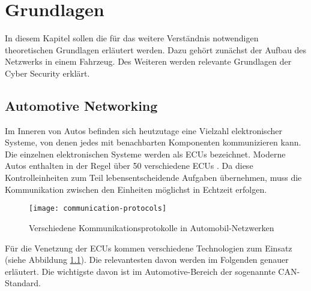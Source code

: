 \chapter{Grundlagen}
In diesem Kapitel sollen die für das weitere Verständnis notwendigen theoretischen Grundlagen erläutert werden. Dazu gehört zunächst der Aufbau des Netzwerks in einem Fahrzeug. Des Weiteren werden relevante Grundlagen der Cyber Security erklärt.

\section{Automotive Networking}
Im Inneren von Autos befinden sich heutzutage eine Vielzahl elektronischer Systeme, von denen jedes mit benachbarten Komponenten kommunizieren kann. Die einzelnen elektronischen Systeme werden als \acp{ECU} bezeichnet. Moderne Autos enthalten in der Regel über 50 verschiedene \acsp{ECU} \cite[vgl.][6]{Miller.2013}. Da diese Kontrolleinheiten zum Teil lebensentscheidende Aufgaben übernehmen, muss die Kommunikation zwischen den Einheiten möglichst in Echtzeit erfolgen. \\

\begin{figure}[H]
\centering
\texttt{[image: communication-protocols]}
\label{fig:communication-protocols}
\caption{Verschiedene Kommunikationsprotokolle in Automobil-Netzwerken}
\end{figure}

Für die Venetzung der \acsp{ECU} kommen verschiedene Technologien zum Einsatz (siehe Abbildung \ref{fig:communication-protocols}). Die relevantesten davon werden im Folgenden genauer erläutert. Die wichtigste  davon ist im Automotive-Bereich der sogenannte \acs{CAN}-Standard.

